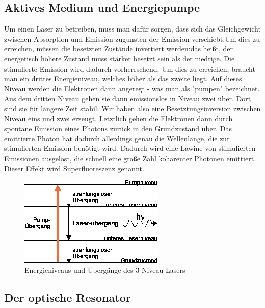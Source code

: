 \subsection{Aktives Medium und Energiepumpe}
Um einen Laser zu betreiben, muss man dafür sorgen, dass sich das Gleichgewicht zwischen Absorption und Emission zugunsten der Emission verschiebt.Um dies zu erreichen, müssen die besetzten Zustände invertiert werden:das heißt, der energetisch höhere Zustand muss stärker besetzt sein als der niedrige. Die  stimulierte Emission wird  dadurch vorherrschend. Um dies zu erreichen, braucht man ein drittes  Energieniveau, welches höher als das zweite liegt. Auf dieses Niveau werden die Elektronen dann angeregt - was man als "pumpen" bezeichnet.
Aus dem dritten Niveau gehen sie dann emissionslos in Niveau zwei über. Dort sind sie für längere Zeit stabil. Wir haben also eine Besetztungsinversion zwischen Niveau eins und zwei erzeugt. Letztlich  gehen die Elektronen dann durch spontane Emission eines Photons zurück in den Grundzustand über. Das emittierte Photon hat dadurch allerdings  genau die Wellenlänge, die zur stimulierten Emission benötigt wird.  Dadurch wird eine Lawine von stimulierten Emissionen ausgelöst, die  schnell eine große Zahl kohärenter Photonen emittiert. Dieser Effekt  wird Superfluoreszenz genannt.

\begin{figure}[here]
\centering
\includegraphics[scale=0.9]{img/HNL4}
\caption{Energieniveaus und Übergänge des 3-Niveau-Lasers}
\begin{center}
\end{center}
\end{figure}

\subsection{Der optische Resonator}

